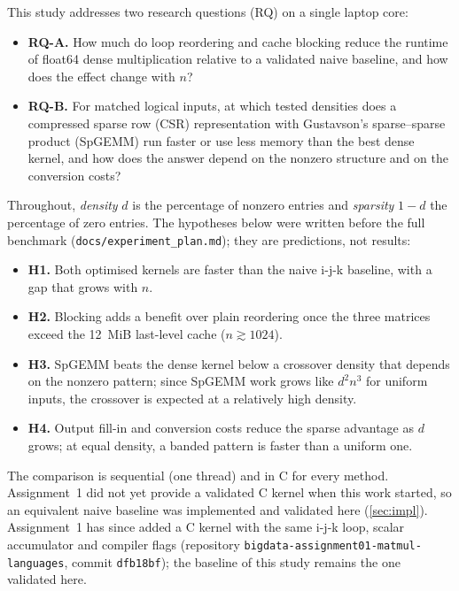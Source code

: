 \documentclass[conference,a4paper]{IEEEtran}
\begin{document}
This study addresses two research questions (RQ) on a single laptop core:
\begin{itemize}
\item \textbf{RQ-A.} How much do loop reordering and cache blocking reduce the runtime of float64 dense
  multiplication relative to a validated naive baseline, and how does the effect change with $n$?
\item \textbf{RQ-B.} For matched logical inputs, at which tested densities does a compressed sparse row
  (CSR) representation with Gustavson's sparse--sparse product (SpGEMM) run faster or use less memory
  than the best dense kernel, and how does the answer depend on the nonzero structure and on the
  conversion costs?
\end{itemize}
Throughout, \emph{density} $d$ is the percentage of nonzero entries and \emph{sparsity} $1-d$ the
percentage of zero entries. The hypotheses below were written before the full benchmark
(\texttt{docs/experiment\_plan.md}); they are predictions, not results:
\begin{itemize}
\item \textbf{H1.} Both optimised kernels are faster than the naive i-j-k baseline, with a gap that grows
  with $n$.
\item \textbf{H2.} Blocking adds a benefit over plain reordering once the three matrices exceed the
  \SI{12}{MiB} last-level cache ($n\gtrsim 1024$).
\item \textbf{H3.} SpGEMM beats the dense kernel below a crossover density that depends on the nonzero
  pattern; since SpGEMM work grows like $d^2n^3$ for uniform inputs, the crossover is expected at a
  relatively high density.
\item \textbf{H4.} Output fill-in and conversion costs reduce the sparse advantage as $d$ grows; at equal
  density, a banded pattern is faster than a uniform one.
\end{itemize}
The comparison is sequential (one thread) and in C for every method. Assignment~1 did not yet provide a
validated C kernel when this work started, so an equivalent naive baseline was implemented and validated
here (\cref{sec:impl}). Assignment~1 has since added a C kernel with the same i-j-k loop, scalar
accumulator and compiler flags (repository \texttt{bigdata-assignment01-matmul-languages}, commit
\texttt{dfb18bf}); the baseline of this study remains the one validated here.

\end{document}
